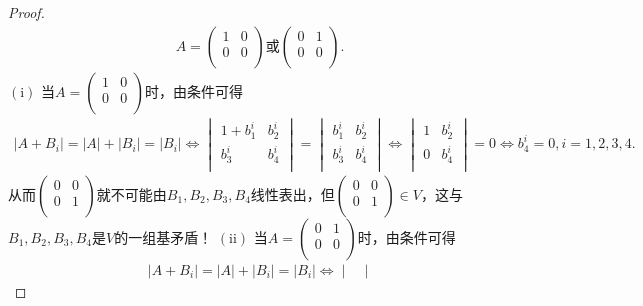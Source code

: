 \documentclass[../../main.tex]{subfiles}
\begin{document}
\begin{proof}
\begin{align*}
A=\begin{pmatrix}
1&		0\\
0&		0\\
\end{pmatrix}\text{或}\begin{pmatrix}
0&		1\\
0&		0\\
\end{pmatrix}.
\end{align*}
$\left( \mathrm{i} \right)$ 当$A=\begin{pmatrix}
1&		0\\
0&		0\\
\end{pmatrix}$时，由条件可得
\begin{align*}
\left| A+B_i \right|=\left| A \right|+\left| B_i \right|=\left| B_i \right|\Longleftrightarrow \begin{vmatrix}
1+b_{1}^{i}&		b_{2}^{i}\\
b_{3}^{i}&		b_{4}^{i}\\
\end{vmatrix}=\begin{vmatrix}
b_{1}^{i}&		b_{2}^{i}\\
b_{3}^{i}&		b_{4}^{i}\\
\end{vmatrix}
\Longleftrightarrow \begin{vmatrix}
1&		b_{2}^{i}\\
0&		b_{4}^{i}\\
\end{vmatrix}=0\Longleftrightarrow b_{4}^{i}=0,i=1,2,3,4.
\end{align*}
从而$\begin{pmatrix}
0&		0\\
0&		1\\
\end{pmatrix}$就不可能由$B_1,B_2,B_3,B_4$线性表出，但$\begin{pmatrix}
0&		0\\
0&		1\\
\end{pmatrix} \in V$，这与$B_1,B_2,B_3,B_4$是$V$的一组基矛盾！
$\left( \mathrm{ii} \right)$ 当$A=\begin{pmatrix}
0&		1\\
0&		0\\
\end{pmatrix}$时，由条件可得
\begin{align*}
\left| A+B_i \right|=\left| A \right|+\left| B_i \right|=\left| B_i \right|\Longleftrightarrow \begin{vmatrix}

\end{vmatrix}
\end{align*}
\end{proof}
\end{document}
